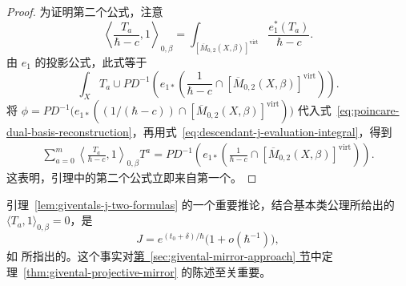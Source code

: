 \begin{proof}
为证明第二个公式，注意
\begin{equation}\label{eq:descendant-j-evaluation-integral}
\left\langle\frac{T_a}{\hbar-c},1\right\rangle_{0,\beta}
=\int_{[\overline M_{0,2}(X,\beta)]^{\mathrm{virt}}}\frac{e_1^*(T_a)}{\hbar-c}.
\end{equation}
由 $e_1$ 的投影公式，此式等于
\[
\int_XT_a\cup PD^{-1}\left(e_{1*}
\left(\frac1{\hbar-c}\cap[\overline M_{0,2}(X,\beta)]^{\mathrm{virt}}\right)\right).
\]
将 $\phi=PD^{-1}\bigl(e_{1*}((1/(\hbar-c))\cap[\overline M_{0,2}(X,\beta)]^{\mathrm{virt}})\bigr)$ 代入式~\eqref{eq:poincare-dual-basis-reconstruction}，再用式~\eqref{eq:descendant-j-evaluation-integral}，得到
\[
\begin{aligned}
\sum_{a=0}^m\left\langle\frac{T_a}{\hbar-c},1\right\rangle_{0,\beta}T^a
=PD^{-1}\left(e_{1*}\left(\frac1{\hbar-c}\cap[\overline M_{0,2}(X,\beta)]^{\mathrm{virt}}\right)\right).
\end{aligned}
\]
这表明，引理中的第二个公式立即来自第一个。
\end{proof}

引理~\ref{lem:giventals-j-two-formulas} 的一个重要推论，结合基本类公理所给出的 $\langle T_a,1\rangle_{0,\beta}=0$，是
\begin{equation}\label{eq:j-function-asymptotic-normalization}
J=e^{(t_0+\delta)/\hbar}\bigl(1+o(\hbar^{-1})\bigr),
\end{equation}
如  所指出的。这个事实对\hyperref[sec:givental-mirror-approach]{第~\ref*{sec:givental-mirror-approach} 节}中定理~\ref{thm:givental-projective-mirror} 的陈述至关重要。

